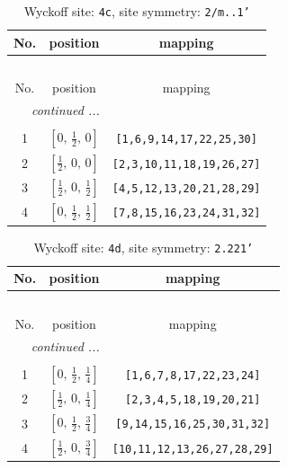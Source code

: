 \documentclass[fleqn,8pt]{jsarticle}
\begin{document}
\renewcommand{\arraystretch}{1.2}
\begin{longtable}{ccc}
\caption{Wyckoff site: {\tt 4c}, site symmetry: {\tt 2/m..1'}}
 \\
 \hline \hline
No. & position & mapping \\ \hline \endfirsthead

\multicolumn{2}{l}{\tablename\ \thetable{}} \\
 \hline \hline
No. & position & mapping \\ \hline \endhead

 \hline \hline
\multicolumn{2}{r}{\footnotesize\it continued ...} \\ \endfoot

 \hline \hline
\multicolumn{2}{r}{} \\ \endlastfoot

1 & $\left[ 0,\, \frac{1}{2},\, 0 \right]$ & {\tt [1,6,9,14,17,22,25,30]} \\ \hline
2 & $\left[ \frac{1}{2},\, 0,\, 0 \right]$ & {\tt [2,3,10,11,18,19,26,27]} \\ \hline
3 & $\left[ \frac{1}{2},\, 0,\, \frac{1}{2} \right]$ & {\tt [4,5,12,13,20,21,28,29]} \\ \hline
4 & $\left[ 0,\, \frac{1}{2},\, \frac{1}{2} \right]$ & {\tt [7,8,15,16,23,24,31,32]} \\
\end{longtable}
\renewcommand{\arraystretch}{1.2}
\begin{longtable}{ccc}
\caption{Wyckoff site: {\tt 4d}, site symmetry: {\tt 2.221'}}
 \\
 \hline \hline
No. & position & mapping \\ \hline \endfirsthead

\multicolumn{2}{l}{\tablename\ \thetable{}} \\
 \hline \hline
No. & position & mapping \\ \hline \endhead

 \hline \hline
\multicolumn{2}{r}{\footnotesize\it continued ...} \\ \endfoot

 \hline \hline
\multicolumn{2}{r}{} \\ \endlastfoot

1 & $\left[ 0,\, \frac{1}{2},\, \frac{1}{4} \right]$ & {\tt [1,6,7,8,17,22,23,24]} \\ \hline
2 & $\left[ \frac{1}{2},\, 0,\, \frac{1}{4} \right]$ & {\tt [2,3,4,5,18,19,20,21]} \\ \hline
3 & $\left[ 0,\, \frac{1}{2},\, \frac{3}{4} \right]$ & {\tt [9,14,15,16,25,30,31,32]} \\ \hline
4 & $\left[ \frac{1}{2},\, 0,\, \frac{3}{4} \right]$ & {\tt [10,11,12,13,26,27,28,29]} \\
\end{longtable}
\end{document}
